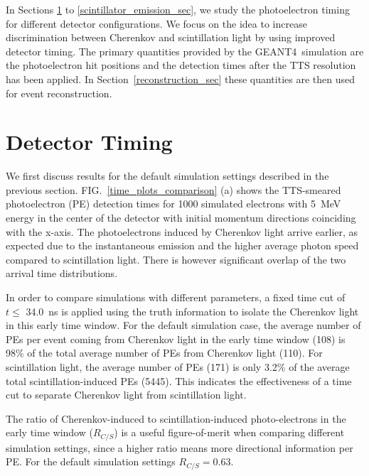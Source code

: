 \documentclass[aps,prc,twocolumn,groupedaddress,showpacs,amsmath,amssymb,floatfix,superscriptaddress]{revtex4}
\newcommand{\GEANT}{GEANT4}
\newcommand{\RCS}{$R_{C/S}$}
\begin{document}
In Sections \ref{detector_timing_sec} to
\ref{scintillator_emission_sec}, we study the
photoelectron timing for different detector configurations. We focus
on the idea to increase discrimination between Cherenkov and
scintillation light by using improved detector timing. The primary
quantities provided by the \GEANT~simulation are the photoelectron hit
positions and the detection times after the TTS resolution has been
applied. In Section~\ref{reconstruction_sec} these quantities are then
used for event reconstruction.

\section{Detector Timing}
\label{detector_timing_sec}

We first discuss results for the default simulation settings described
in the previous section. FIG.~\ref{time_plots_comparison} (a) shows
the TTS-smeared photoelectron (PE) detection times for 1000 simulated
electrons with 5~MeV energy in the center of the detector with initial
momentum directions coinciding with the x-axis. The photoelectrons
induced by Cherenkov light arrive earlier, as expected due to the
instantaneous emission and the higher average photon speed compared to
scintillation light. There is however significant overlap of the two
arrival time distributions.

In order to compare simulations with different parameters, a fixed
time cut of $t\leq$ 34.0~ns is applied using the truth information to
isolate the Cherenkov light in this early time window. For the default
simulation case, the average number of PEs per event coming from
Cherenkov light in the early time window (108) is 98\% of the total
average number of PEs from Cherenkov light (110). For scintillation
light, the average number of PEs (171) is only 3.2\% of the average total
scintillation-induced PEs (5445). This indicates the effectiveness of
a time cut to separate Cherenkov light from scintillation light. 

The ratio of Cherenkov-induced to scintillation-induced photo-electrons
in the early time window (\RCS) is a useful figure-of-merit when
comparing different simulation settings, since a higher ratio means
more directional information per PE. For the default simulation
settings $R_{C/S}=0.63$.
\end{document}
